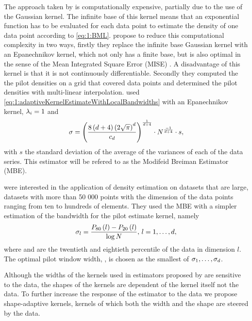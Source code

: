 The approach taken by \citeauthor{breiman1977variable} is computationally expensive, partially due to the use of the Gaussian kernel. The infinite base of this kernel means that an exponential function has to be evaluated for each data point to estimate the density of one data point according to \cref{eq:1:BML}. \textcite{wilkinson1995dataplot} propose to reduce this computational complexity in two ways, firstly they replace the infinite base Gaussian kernel with an Epanechnikov kernel, which not only has a finite base, but is also optimal in the sense of the Mean Integrated Square Error (MISE) \cite{epanechnikov1969non}. A disadvantage of this kernel is that it is not continuously differentiable. Secondly they computed the the pilot densities on a grid that covered data points and determined the pilot densities with multi-linear interpolation. \citeauthor{wilkinson1995dataplot} used \cref{eq:1:adaptiveKernelEstimateWithLocalBandwidths} with an Epanechnikov kernel, $\lambda_{i} = 1$ and 
	\begin{equation}\label{eq:1:wilkinsonHOpt}
		\sigma = \left(\frac{8\left(d + 4\right)\left(2 \sqrt{\pi}\right)^d}{c_d}\right)^{\frac{1}{d + 4}}\cdot N^{\frac{-1}{d + 4}} \cdot s,
	\end{equation}
with $s$ the standard deviation of the average of the variances of each of the data series. This estimator will be refered to as the Modifeid Breiman Estimator (MBE). 

\textcite{ferdosi2011comparison} were interested in the application of density estimation on datasets that are large, \ie datasets with more than 50 000 points with the dimension of the data points ranging from ten to hundreds of elements. They used the MBE with a simpler estimation of the bandwidth for the pilot estimate kernel, namely 
	\begin{equation}
		\sigma_l = \frac{P_{80}\left( l \right) - P_{20}\left( l \right)}{\log N}, \, l = 1, \dotsc, d,
	\end{equation}
where  and  are the twentieth and eightieth percentile of the data in dimension $l$. 
The optimal pilot window width, \varBandwidth, is chosen as the smallest of $\sigma_1, \dotsc, \sigma_d$.

Although the widths of the kernels used in estimators proposed by \citeauthor{breiman1977variable,wilkinson1995dataplot} are sensitive to the data, the shapes of the kernels are dependent of the kernel itself not the data. To further increase the response of the estimator to the data we propose shape-adaptive kernels, kernels of which both the width and the shape are steered by the data. 

